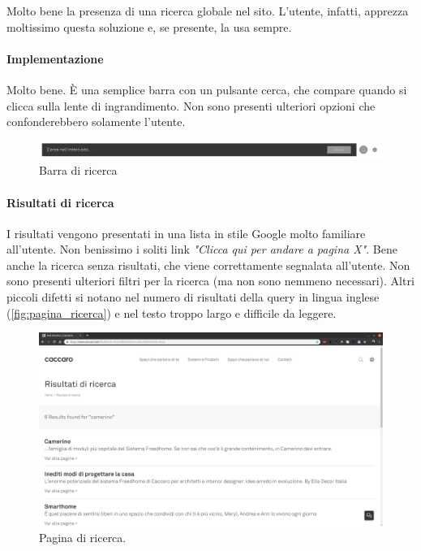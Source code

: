 Molto bene la presenza di una ricerca globale nel sito. L'utente, infatti, apprezza moltissimo questa soluzione e, se presente, la usa sempre.

\paragraph*{Implementazione}
Molto bene. \`E una semplice barra con un pulsante cerca, che compare quando si clicca sulla lente di ingrandimento. Non sono presenti ulteriori opzioni che confonderebbero solamente l'utente.

\begin{figure}
	\centering
	\includegraphics[width=\textwidth]{sez/Elementi_Comuni/img/barra_ricerca.png}
	\caption{Barra di ricerca}
	\label{fig:barra_ricerca}
\end{figure}

\paragraph*{Risultati di ricerca}
I risultati vengono presentati in una lista in stile Google molto familiare all'utente. Non benissimo i soliti link \textit{"Clicca qui per andare a pagina X"}. Bene anche la ricerca senza risultati, che viene correttamente segnalata all'utente. Non sono presenti ulteriori filtri per la ricerca (ma non sono nemmeno necessari). Altri piccoli difetti si notano nel numero di risultati della query in lingua inglese (\autoref{fig:pagina_ricerca}) e nel testo troppo largo e difficile da leggere.

\begin{figure}[H]
	\includegraphics[width=\textwidth]{sez/Elementi_Comuni/pag_ricerca.png}
	\caption{Pagina di ricerca.}
	\label{fig:pagina_ricerca}
\end{figure}
